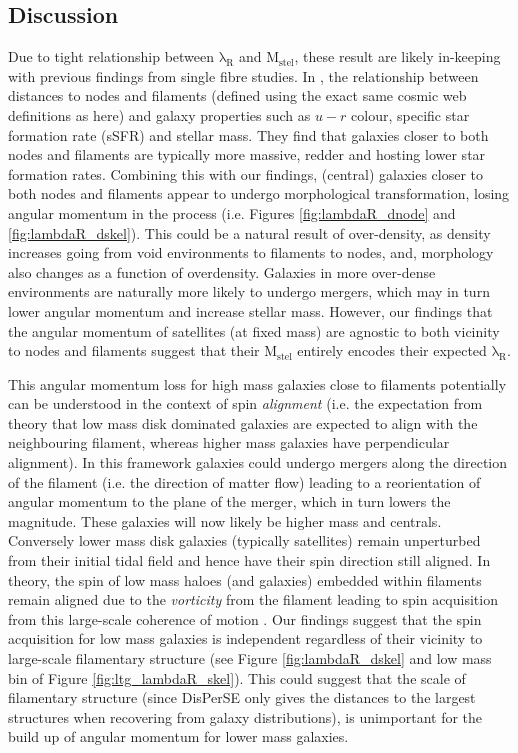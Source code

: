 \subsection{Discussion}
Due to tight relationship between $\mathrm{\lambda_R}$ and $\mathrm{M_{stel}}$, these result are likely in-keeping with previous findings from single fibre studies. In \citet{kraljic2018}, the relationship between distances to nodes and filaments (defined using the exact same cosmic web definitions as here) and galaxy properties such as $u - r$ colour, specific star formation rate (sSFR) and stellar mass. They find that galaxies closer to both nodes and filaments are typically more massive, redder and hosting lower star formation rates. Combining this with our findings, (central) galaxies closer to both nodes and filaments appear to undergo morphological transformation, losing angular momentum in the process (i.e. Figures \ref{fig:lambdaR_dnode} and \ref{fig:lambdaR_dskel}). This could be a natural result of over-density, as density increases going from void environments to filaments to nodes, and, morphology also changes as a function of overdensity. Galaxies in more over-dense environments are naturally more likely to undergo mergers, which may in turn lower angular momentum and increase stellar mass. However, our findings that the angular momentum of satellites (at fixed mass) are agnostic to both vicinity to nodes and filaments suggest that their $\mathrm{M_{stel}}$ entirely encodes their expected $\mathrm{\lambda_R}$. 

This angular momentum loss for high mass galaxies close to filaments potentially can be understood in the context of spin \textit{alignment} (i.e. the expectation from theory that low mass disk dominated galaxies are expected to align with the neighbouring filament, whereas higher mass galaxies have perpendicular alignment). In this framework galaxies could undergo mergers along the direction of the filament (i.e. the direction of matter flow) leading to a reorientation of angular momentum to the plane of the merger, which in turn lowers the magnitude. These galaxies will now likely be higher mass and centrals. Conversely lower mass disk galaxies (typically satellites) remain unperturbed from their initial tidal field and hence have their spin direction still aligned. In theory, the spin of low mass haloes (and galaxies) embedded within filaments remain aligned due to the \textit{vorticity} from the filament leading to spin acquisition from this large-scale coherence of motion \citep[e.g.][]{pichon2011,laigle2015, codis2015}. Our findings suggest that the spin acquisition for low mass galaxies is independent regardless of their vicinity to large-scale filamentary structure (see Figure \ref{fig:lambdaR_dskel} and low mass bin of Figure \ref{fig:ltg_lambdaR_skel}). This could suggest that the scale of filamentary structure (since DisPerSE only gives the distances to the largest structures when recovering from galaxy distributions), is unimportant for the build up of angular momentum for lower mass galaxies.

